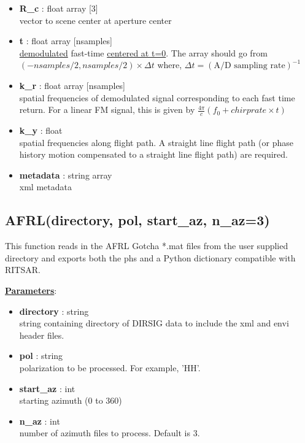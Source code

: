 \documentclass{article}
\newcommand{\defs}[2]{\textbf{{#1}} : {#2}}
\begin{document}
\begin{itemize}
\begin{itemize}
	       	(x,y,z) coordinates of platform, referenced to scene center, which is located at (0,0,0)
	    \item \defs{R\_c}{float array [3]}\\
	     	vector to scene center at aperture center
	    \item \defs{t}{float array [nsamples]}\\
   	    	\underline{demodulated} fast-time \underline{centered at t=0}.  The array should go from $(-nsamples/2, nsamples/2)\times\Delta t$ where, $\Delta t = (\mbox{A/D sampling rate})^{-1}$
   	    \item\defs{k\_r}{float array [nsamples]}\\
   	    	spatial frequencies of demodulated signal corresponding to each fast time return.  For a linear FM signal, this is given by $\frac{4\pi}{c}(f_0+chirprate\times t)$
		\item\defs{k\_y}{float}\\
   	    	spatial frequencies along flight path.  A straight line flight path (or phase history motion compensated to a straight line flight path) are required.
   	    \item\defs{metadata}{string array}\\
   	    	xml metadata
	  \end{itemize}
\end{itemize}


\subsection{AFRL(directory, pol, start\_az, n\_az=3)}
This function reads in the AFRL Gotcha *.mat files from the user supplied directory and exports both the phs and a Python dictionary compatible with RITSAR.

\noindent \underline{\textbf{Parameters}}:
\begin{itemize}
  	\item \defs{directory}{string}\\
  		string containing directory of DIRSIG data to include the xml and envi header files.
  	\item \defs{pol}{string}\\
  		polarization to be processed.  For example, 'HH'.
  	\item \defs{start\_az}{int}\\
  		starting azimuth (0 to 360)
  	\item \defs{n\_az}{int}\\
   		number of azimuth files to process.  Default is 3.
\end{itemize}
\end{document}
